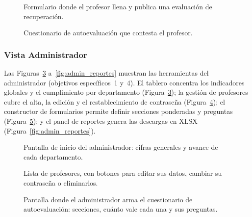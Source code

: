 \begin{figure}[!htbp]
    \centering
    \caption{Formulario donde el profesor llena y publica una evaluación de recuperación.}
    \label{fig:docente_requisito_form}
\end{figure}

\begin{figure}[!htbp]
    \centering
    \caption{Cuestionario de autoevaluación que contesta el profesor.}
    \label{fig:docente_autoevaluacion}
\end{figure}

\subsubsection{Vista Administrador}

Las Figuras~\ref{fig:admin_dashboard} a~\ref{fig:admin_reportes} muestran las herramientas del administrador (objetivos específicos~1 y~4). El tablero concentra los indicadores globales y el cumplimiento por departamento (Figura~\ref{fig:admin_dashboard}); la gestión de profesores cubre el alta, la edición y el restablecimiento de contraseña (Figura~\ref{fig:admin_profesores}); el constructor de formularios permite definir secciones ponderadas y preguntas (Figura~\ref{fig:admin_formulario_builder}); y el panel de reportes genera las descargas en XLSX (Figura~\ref{fig:admin_reportes}).

\begin{figure}[!htbp]
    \centering
    \caption{Pantalla de inicio del administrador: cifras generales y avance de cada departamento.}
    \label{fig:admin_dashboard}
\end{figure}

\begin{figure}[!htbp]
    \centering
    \caption{Lista de profesores, con botones para editar sus datos, cambiar su contraseña o eliminarlos.}
    \label{fig:admin_profesores}
\end{figure}

\begin{figure}[!htbp]
    \centering
    \caption{Pantalla donde el administrador arma el cuestionario de autoevaluación: secciones, cuánto vale cada una y sus preguntas.}
    \label{fig:admin_formulario_builder}
\end{figure}

